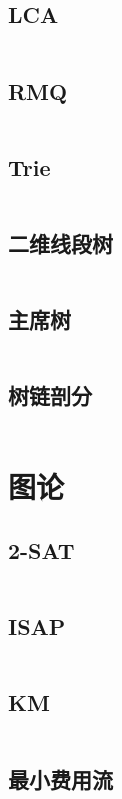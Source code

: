 \documentclass[titlepage,landscape,a4paper,10pt]{article}
\begin{document}
\begin{multicols}{2}
\begin{spacing}{0.8}
\subsection{LCA}
\inputminted{cpp}{DataStructure/LCA.cpp}

\subsection{RMQ}
\inputminted{cpp}{DataStructure/RMQ.cpp}

\subsection{Trie}
\inputminted{cpp}{DataStructure/trie.cpp}

\subsection{二维线段树}
\inputminted{cpp}{DataStructure/二维线段树.cpp}

\subsection{主席树}
\inputminted{cpp}{DataStructure/主席树.cpp}

\subsection{树链剖分}
\inputminted{cpp}{DataStructure/树链剖分.cpp}
\section{图论}

\subsection{2-SAT}
\inputminted{cpp}{Graph/2-SAT.cpp}

\subsection{ISAP}
\inputminted{cpp}{Graph/ISAP.cpp}

\subsection{KM}
\inputminted{cpp}{Graph/KM.cpp}

\subsection{最小费用流}
\inputminted{cpp}{Graph/MinCostFlow.cpp}


\end{spacing}
\end{multicols}
\end{document}

